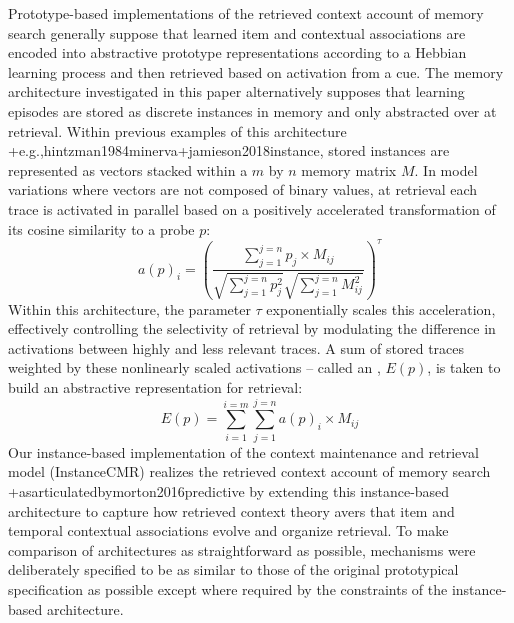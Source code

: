 \markdownRendererInterblockSeparator
{}Prototype-based implementations of the retrieved context account of memory search generally suppose that learned item and contextual associations are encoded into abstractive prototype representations according to a Hebbian learning process and then retrieved based on activation from a cue. The memory architecture investigated in this paper alternatively supposes that learning episodes are stored as discrete instances in memory and only abstracted over at retrieval. Within previous examples of this architecture +{e.g.,}{}{hintzman1984minerva}+{}{}{jamieson2018instance}, stored instances are represented as vectors stacked within a $m$ by $n$ memory matrix $M$. In model variations where vectors are not composed of binary values, at retrieval each trace is activated in parallel based on a positively accelerated transformation of its cosine similarity to a probe $p$:\markdownRendererInterblockSeparator
{}\begin{equation} \label{eq:14} a(p)_i = \left({\frac {\sum^{j=n}_{j=1}{p_j \times M_{ij}}} {\sqrt{\sum^{j=n}_{j=1}{p^2_j}} \sqrt{\sum^{j=n}_{j=1}{M^2_{ij}}}}}\right)^{\tau} \end{equation}\markdownRendererInterblockSeparator
{}Within this architecture, the parameter $\tau$ exponentially scales this acceleration, effectively controlling the selectivity of retrieval by modulating the difference in activations between highly and less relevant traces. A sum of stored traces weighted by these nonlinearly scaled activations -- called an , $E(p)$, is taken to build an abstractive representation for retrieval:\markdownRendererInterblockSeparator
{}\begin{equation} \label{eq:15} E(p) = \sum^{i=m}_{i=1}\sum^{j=n}_{j=1}a(p)_i \times M_{ij} \end{equation}\markdownRendererInterblockSeparator
{}Our instance-based implementation of the context maintenance and retrieval model (InstanceCMR) realizes the retrieved context account of memory search +{as\markdownRendererNbsp{}articulated\markdownRendererNbsp{}by}{}{morton2016predictive} by extending this instance-based architecture to capture how retrieved context theory avers that item and temporal contextual associations evolve and organize retrieval. To make comparison of architectures as straightforward as possible, mechanisms were deliberately specified to be as similar to those of the original prototypical specification as possible except where required by the constraints of the instance-based architecture.\markdownRendererInterblockSeparator
